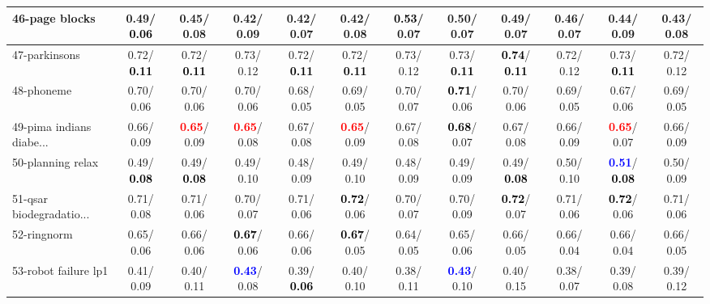 \begin{table}[h]
\begin{center}
{\begin{tabular}{lc|c|c|c|c|c|c|c|c|c|c}
46-page blocks &   0.49/\textcolor{black}{\textbf{  0.06}} &   0.45/  0.08 &   0.42/  0.09 &   0.42/  0.07 &   0.42/  0.08 & \textcolor{black}{\textbf{  0.53}}/  0.07 &   0.50/  0.07 &   0.49/  0.07 &   0.46/  0.07 &   0.44/  0.09 &   0.43/  0.08 \\ \hline
47-parkinsons &   0.72/\textcolor{black}{\textbf{  0.11}} &   0.72/\textcolor{black}{\textbf{  0.11}} &   0.73/  0.12 &   0.72/\textcolor{black}{\textbf{  0.11}} &   0.72/\textcolor{black}{\textbf{  0.11}} &   0.73/  0.12 &   0.73/\textcolor{black}{\textbf{  0.11}} & \textcolor{black}{\textbf{  0.74}}/\textcolor{black}{\textbf{  0.11}} &   0.72/  0.12 &   0.73/\textcolor{black}{\textbf{  0.11}} &   0.72/  0.12 \\
48-phoneme &   0.70/  0.06 &   0.70/  0.06 &   0.70/  0.06 &   0.68/  0.05 &   0.69/  0.05 &   0.70/  0.07 & \textcolor{black}{\textbf{  0.71}}/  0.06 &   0.70/  0.06 &   0.69/  0.05 &   0.67/  0.06 &   0.69/  0.05 \\
49-pima indians diabe... &   0.66/  0.09 & \textcolor{red}{\textbf{  0.65}}/  0.09 & \textcolor{red}{\textbf{  0.65}}/  0.08 &   0.67/  0.08 & \textcolor{red}{\textbf{  0.65}}/  0.09 &   0.67/  0.08 & \textcolor{black}{\textbf{  0.68}}/  0.07 &   0.67/  0.08 &   0.66/  0.09 & \textcolor{red}{\textbf{  0.65}}/  0.07 &   0.66/  0.09 \\
50-planning relax &   0.49/\textcolor{black}{\textbf{  0.08}} &   0.49/\textcolor{black}{\textbf{  0.08}} &   0.49/  0.10 &   0.48/  0.09 &   0.49/  0.10 &   0.48/  0.09 &   0.49/  0.09 &   0.49/\textcolor{black}{\textbf{  0.08}} &   0.50/  0.10 & \textcolor{blue}{\textbf{  0.51}}/\textcolor{black}{\textbf{  0.08}} &   0.50/  0.09 \\
51-qsar biodegradatio... &   0.71/  0.08 &   0.71/  0.06 &   0.70/  0.07 &   0.71/  0.06 & \textcolor{black}{\textbf{  0.72}}/  0.06 &   0.70/  0.07 &   0.70/  0.09 & \textcolor{black}{\textbf{  0.72}}/  0.07 &   0.71/  0.06 & \textcolor{black}{\textbf{  0.72}}/  0.06 &   0.71/  0.06 \\
52-ringnorm &   0.65/  0.06 &   0.66/  0.06 & \textcolor{black}{\textbf{  0.67}}/  0.06 &   0.66/  0.06 & \textcolor{black}{\textbf{  0.67}}/  0.05 &   0.64/  0.05 &   0.65/  0.06 &   0.66/  0.05 &   0.66/  0.04 &   0.66/  0.04 &   0.66/  0.05 \\
53-robot failure lp1 &   0.41/  0.09 &   0.40/  0.11 & \textcolor{blue}{\textbf{  0.43}}/  0.08 &   0.39/\textcolor{black}{\textbf{  0.06}} &   0.40/  0.10 &   0.38/  0.11 & \textcolor{blue}{\textbf{  0.43}}/  0.10 &   0.40/  0.15 &   0.38/  0.07 &   0.39/  0.08 &   0.39/  0.12 \\ \hline

\end{tabular}}
\end{center}
\end{table}
